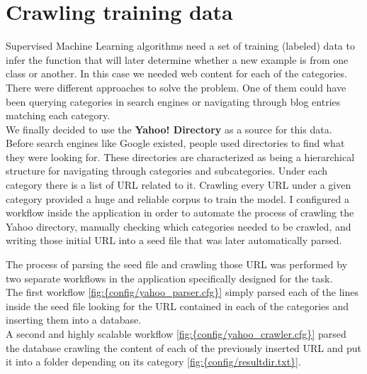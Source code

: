 \section{Crawling training data}
Supervised Machine Learning algorithms need a set of training (labeled) data to infer the function that will later determine whether a new example is from one class or another. In this case we needed
web content for each of the categories. There were different approaches to solve the problem. One of them could have been querying categories in search engines or navigating through blog entries matching
each category. \\
We finally decided to use the {\bf Yahoo! Directory}\cite{yahoo} as a source for this data.
Before search engines like Google existed, people used directories to find what they were looking for. These directories are characterized as being a hierarchical structure for navigating through categories
and subcategories. Under each category there is a list of URL related to it.  
Crawling every URL under a given category provided a huge and reliable corpus to train the model.
I configured a workflow inside the application in order to automate the process of crawling the Yahoo directory, manually checking which categories needed to be crawled, and writing those initial URL into 
a seed file that was later automatically parsed.


The process of parsing the seed file and crawling those URL was performed by two separate  workflows in the application specifically designed for the task. \\
The first workflow \ref{fig:{config/yahoo_parser.cfg}} simply parsed each of the lines inside the seed file looking for the URL contained in each of the categories and inserting them into a database. \\
A second and highly scalable workflow \ref{fig:{config/yahoo_crawler.cfg}} parsed the database crawling the content of each of the previously inserted URL and put it into a folder depending on its category \ref{fig:{config/resultdir.txt}}. \\


\clearpage
{}

\clearpage
{}

